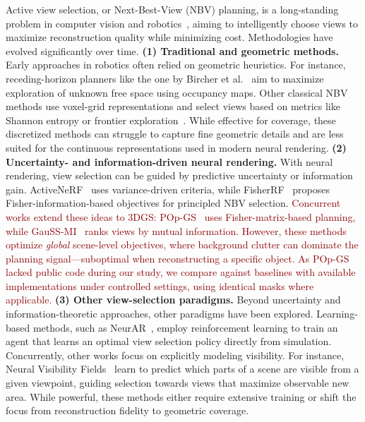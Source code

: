 \documentclass{egpubl}
\newcommand{\rev}[1]{\textcolor{darkred}{#1}}
\begin{document}
Active view selection, or Next-Best-View (NBV) planning, is a long-standing problem in computer vision and robotics~\cite{chen2011active}, aiming to intelligently choose views to maximize reconstruction quality while minimizing cost. Methodologies have evolved significantly over time.
\textbf{(1) Traditional and geometric methods.}
Early approaches in robotics often relied on geometric heuristics. For instance, receding-horizon planners like the one by Bircher et al.~\cite{bircherRecedingHorizonNextBestView2016} aim to maximize exploration of unknown free space using occupancy maps. Other classical NBV methods use voxel-grid representations and select views based on metrics like Shannon entropy or frontier exploration~\cite{kim2022infonerfrayentropyminimization}. While effective for coverage, these discretized methods can struggle to capture fine geometric details and are less suited for the continuous representations used in modern neural rendering.
\textbf{(2) Uncertainty- and information-driven neural rendering.}
With neural rendering, view selection can be guided by predictive uncertainty or information gain.
ActiveNeRF~\cite{panActiveNeRFLearningWhere2022} uses variance-driven criteria, while FisherRF~\cite{jiangFisherRFActiveView2024} proposes Fisher-information-based objectives for principled NBV selection.
\rev{Concurrent works extend these ideas to 3DGS: POp-GS~\cite{wilsonPOpGSNextBest2025a} uses Fisher-matrix-based planning, while GauSS-MI~\cite{xieGauSSMIGaussianSplatting2025} ranks views by mutual information. However, these methods optimize \emph{global} scene-level objectives, where background clutter can dominate the planning signal—suboptimal when reconstructing a specific object. As POp-GS lacked public code during our study, we compare against baselines with available implementations under controlled settings, using identical masks where applicable.}
\textbf{(3) Other view-selection paradigms.}
Beyond uncertainty and information-theoretic approaches, other paradigms have been explored. Learning-based methods, such as NeurAR~\cite{NeurARRan_2023}, employ reinforcement learning to train an agent that learns an optimal view selection policy directly from simulation. Concurrently, other works focus on explicitly modeling visibility. For instance, Neural Visibility Fields~\cite{xue2024neuralvisibilityfielduncertaintydriven} learn to predict which parts of a scene are visible from a given viewpoint, guiding selection towards views that maximize observable new area. While powerful, these methods either require extensive training or shift the focus from reconstruction fidelity to geometric coverage.
\end{document}
